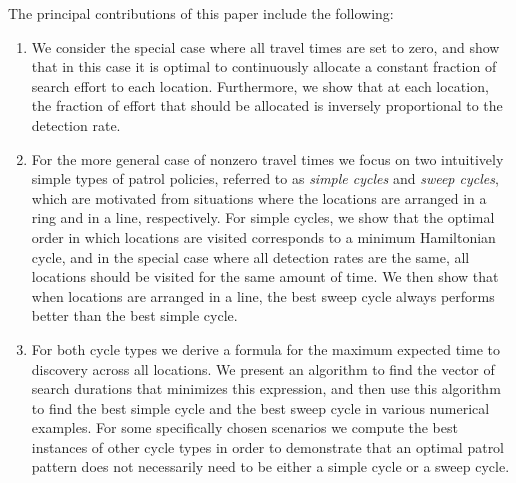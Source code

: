\documentclass[11pt,a4paper]{article}
\begin{document}
The principal contributions of this paper include the following:
\begin{enumerate}
    \item  We consider the special case where all travel times are set to zero, and show that in this case %
    it is optimal %
    to continuously allocate a constant fraction of search effort to each location. Furthermore, we show that at each location, the fraction of effort that should be allocated is inversely proportional to the detection rate.
    \item For the more general case of nonzero travel times we focus on two intuitively simple types of patrol policies, referred to as \textit{simple cycles} and \textit{sweep cycles}, which are motivated from situations where the locations are arranged in a ring and in a line, respectively. %
    For simple cycles, we show that the optimal order in which locations are visited corresponds to a minimum Hamiltonian cycle, and in the special case where all detection rates are the same, all locations should be visited for the same amount of time. %
    We then show that when locations are arranged in a line, the best sweep cycle always performs better than the best simple cycle.
    \item For both cycle types we derive a formula for the maximum expected time to discovery across all locations. We present an algorithm to find the vector of search durations that minimizes this expression, and then use this algorithm to find the best simple cycle and the best sweep cycle in various numerical examples. For some specifically chosen scenarios we compute the best instances of other cycle types in order to demonstrate that an optimal patrol pattern does not necessarily need to be either a simple cycle or a sweep cycle.
\end{enumerate}
\end{document}

